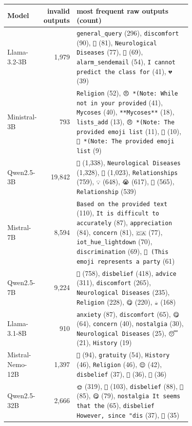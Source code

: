 \begin{tabular}{lrp{0.75\linewidth}}
\toprule
Model & invalid outputs & most frequent raw outputs (count) \\
\midrule
Llama-3.2-3B & 1,979 & \texttt{general\_query} (296), \texttt{discomfort} (90), \texttt{🎃} (81), \texttt{Neurological Diseases} (77), \texttt{🎉} (69), \texttt{alarm\_sendemail} (54), \texttt{I cannot predict the class for} (41), \texttt{💔} (39) \\
Ministral-3B & 793 & \texttt{Religion} (52), \texttt{😠 *(Note: While not in your provided} (41), \texttt{Mycoses} (40), \texttt{**Mycoses**} (18), \texttt{lists\_add} (13), \texttt{😠 *(Note: The provided emoji list} (11), \texttt{🎉} (10), \texttt{🎨 *(Note: The provided emoji list} (9) \\
Qwen2.5-3B & 19,842 & \texttt{👏} (1,338), \texttt{Neurological Diseases} (1,328), \texttt{🎉} (1,023), \texttt{Relationships} (759), \texttt{💡} (648), \texttt{😭} (617), \texttt{🌟} (565), \texttt{Relationship} (539) \\
Mistral-7B & 8,594 & \texttt{Based on the provided text} (110), \texttt{It is difficult to accurately} (87), \texttt{appreciation} (84), \texttt{concern} (81), \texttt{🇨🇦} (77), \texttt{iot\_hue\_lightdown} (70), \texttt{discrimination} (69), \texttt{🎉 (This emoji represents a party} (61) \\
Qwen2.5-7B & 9,224 & \texttt{🎉} (758), \texttt{disbelief} (418), \texttt{advice} (311), \texttt{discomfort} (265), \texttt{Neurological Diseases} (235), \texttt{Religion} (228), \texttt{😋} (220), \texttt{☕} (168) \\
Llama-3.1-8B & 910 & \texttt{anxiety} (87), \texttt{discomfort} (65), \texttt{😋} (64), \texttt{concern} (40), \texttt{nostalgia} (30), \texttt{Neurological Diseases} (25), \texttt{😴} (21), \texttt{History} (19) \\
Mistral-Nemo-12B & 1,397 & \texttt{💪} (94), \texttt{gratuity} (54), \texttt{History} (46), \texttt{Religion} (46), \texttt{😌} (42), \texttt{disbelief} (37), \texttt{🍻} (36), \texttt{🎉} (36) \\
Qwen2.5-32B & 2,666 & \texttt{🌞} (319), \texttt{🎉} (103), \texttt{disbelief} (88), \texttt{💪} (85), \texttt{😋} (79), \texttt{nostalgia It seems that the} (65), \texttt{disbelief However, since "dis} (37), \texttt{🎃} (35) \\
\bottomrule
\end{tabular}
